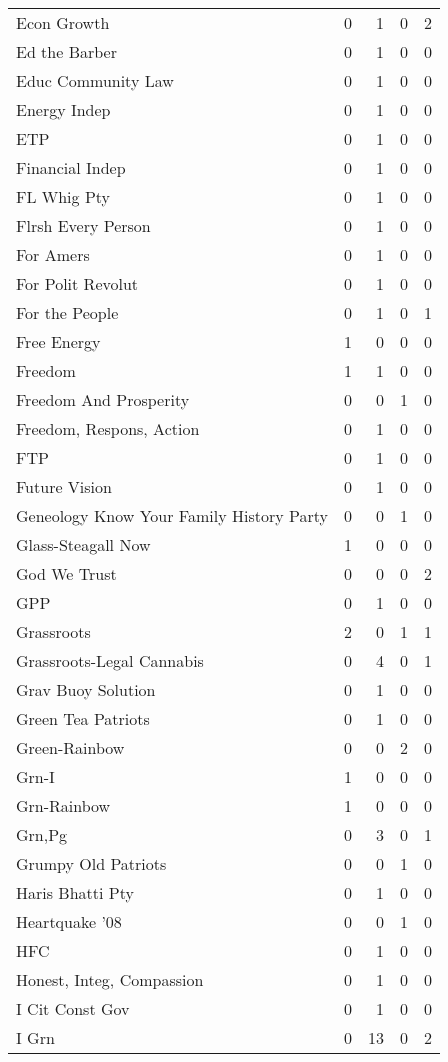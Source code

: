 \begin{supertabular}{lrrrr}
Econ Growth & 0 & 1 & 0 & 2\\
Ed the Barber & 0 & 1 & 0 & 0\\
Educ Community Law & 0 & 1 & 0 & 0\\
Energy Indep & 0 & 1 & 0 & 0\\
ETP & 0 & 1 & 0 & 0\\
Financial Indep & 0 & 1 & 0 & 0\\
FL Whig Pty & 0 & 1 & 0 & 0\\
Flrsh Every Person & 0 & 1 & 0 & 0\\
For Amers & 0 & 1 & 0 & 0\\
For Polit Revolut & 0 & 1 & 0 & 0\\
For the People & 0 & 1 & 0 & 1\\
Free Energy & 1 & 0 & 0 & 0\\
Freedom & 1 & 1 & 0 & 0\\
Freedom And Prosperity & 0 & 0 & 1 & 0\\
Freedom, Respons, Action & 0 & 1 & 0 & 0\\
FTP & 0 & 1 & 0 & 0\\
Future Vision & 0 & 1 & 0 & 0\\
Geneology Know Your Family History Party & 0 & 0 & 1 & 0\\
Glass-Steagall Now & 1 & 0 & 0 & 0\\
God We Trust & 0 & 0 & 0 & 2\\
GPP & 0 & 1 & 0 & 0\\
Grassroots & 2 & 0 & 1 & 1\\
Grassroots-Legal Cannabis & 0 & 4 & 0 & 1\\
Grav Buoy Solution & 0 & 1 & 0 & 0\\
Green Tea Patriots & 0 & 1 & 0 & 0\\
Green-Rainbow & 0 & 0 & 2 & 0\\
Grn-I & 1 & 0 & 0 & 0\\
Grn-Rainbow & 1 & 0 & 0 & 0\\
Grn,Pg & 0 & 3 & 0 & 1\\
Grumpy Old Patriots & 0 & 0 & 1 & 0\\
Haris Bhatti Pty & 0 & 1 & 0 & 0\\
Heartquake '08 & 0 & 0 & 1 & 0\\
HFC & 0 & 1 & 0 & 0\\
Honest, Integ, Compassion & 0 & 1 & 0 & 0\\
I Cit Const Gov & 0 & 1 & 0 & 0\\
I Grn & 0 & 13 & 0 & 2\\

\end{supertabular}
